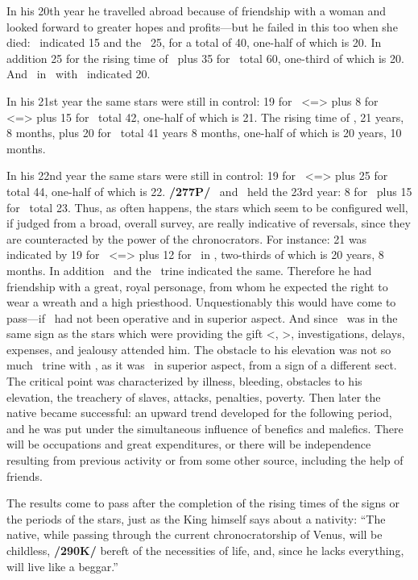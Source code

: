 In his 20th year he travelled abroad because of friendship with
a woman and looked forward to greater hopes and profits—but he failed in this too when she died: \Mars \, indicated 15 and the \Moon\, 25, for a total of 40, one-half of which is 20. In addition 25 for the rising time of \Taurus\, plus 35 for \Leo\, total 60, one-third of which is 20. And \Mercury\, in \Aries\, with \Saturn\, indicated 20. 

In his 21st year the same stars were still in control: 19 for \Leo\, <=\Sun> plus 8 for \Taurus\, <=\Venus> plus 15 for \Mars\, total 42, one-half of which is 21. The rising time of \Aries, 21 years, 8 months, plus 20 for \Mercury\, total 41 years 8 months, one-half of which is 20 years, 10 months. 

In his 22nd year the same stars were still in control: 19 for \Leo\, <=\Sun> plus 25 for \Taurus\, total 44, one-half of which is 22. \textbf{/277P/} \Venus\, and \Mars\, held the 23rd year: 8 for \Venus\, plus 15 for \Mars\, total 23. Thus, as often happens, the stars which seem to be configured well, if judged from a broad, overall survey, are really indicative of reversals, since they are counteracted by the power of the chronocrators. For instance: 21 was indicated by 19 for \Leo\, <=\Sun> plus 12 for \Jupiter\, in \Leo, two-thirds of which is 20 years, 8 months. In addition \Jupiter\, and the \Sun\, trine indicated the same. Therefore he had friendship with a great, royal personage, from whom he expected the right to wear a wreath and a high priesthood. Unquestionably this would have come to pass—if \Mars\, had not been operative and in superior aspect. And since \Saturn\, was in the same sign as the stars which were providing the gift <\Sun, \Mercury>, investigations, delays, expenses, and jealousy attended him. The obstacle to his elevation was not so much \Saturn\, trine with \Jupiter, as it was \Mars\, in superior aspect, from a sign of a different sect. The critical point was characterized by illness, bleeding, obstacles to his elevation, the treachery of slaves, attacks, penalties, poverty. Then later the native became successful: an upward trend developed for the
following period, and he was put under the simultaneous influence of benefics and malefics. There will be occupations and great expenditures, or there will be independence resulting from previous activity or from some other source, including the help of friends.

The \mndl results come to pass after the completion of the rising times of the signs or the periods of the stars, just as the King himself says about a nativity: “The native, while passing through the current
chronocratorship of Venus, will be childless, \textbf{/290K/} bereft of the necessities of life, and, since he lacks everything, will live like a beggar.” 

